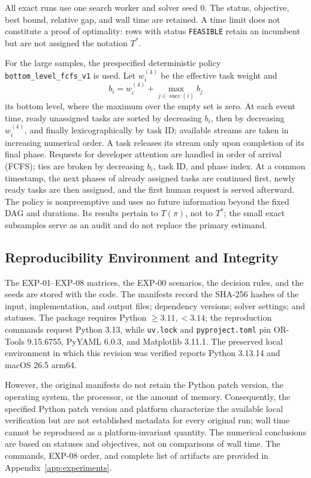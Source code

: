 All exact runs use one search worker and solver seed 0. The status, objective,
best bound, relative gap, and wall time are retained. A time limit does not
constitute a proof of optimality: rows with status \texttt{FEASIBLE} retain an
incumbent but are not assigned the notation $T^*$.

For the large samples, the prespecified deterministic policy
\texttt{bottom\_level\_fcfs\_v1} is used. Let $w_i^{(4)}$ be the effective task
weight and
\[
  b_i=w_i^{(4)}+\max_{j\in\operatorname{succ}(i)}b_j
\]
its bottom level, where the maximum over the empty set is zero. At each event
time, ready unassigned tasks are sorted by decreasing $b_i$, then by decreasing
$w_i^{(4)}$, and finally lexicographically by task ID; available streams are
taken in increasing numerical order. A task releases its stream only upon
completion of its final phase. Requests for developer attention are handled in
order of arrival (FCFS); ties are broken by decreasing $b_i$, task ID, and phase
index.
At a common timestamp, the next phases of already assigned tasks are continued
first, newly ready tasks are then assigned, and the first human request is
served afterward. The policy is nonpreemptive and uses no future information
beyond the fixed DAG and durations. Its results pertain to $T(\pi)$, not to
$T^*$; the small exact subsamples serve as an audit and do not replace the
primary estimand.

\subsection{Reproducibility Environment and Integrity}

The EXP-01--EXP-08 matrices, the EXP-00 scenarios, the decision rules, and the
seeds are stored with the code. The manifests record the SHA-256 hashes of the
input, implementation, and output files; dependency versions; solver settings;
and statuses. The package requires Python $\ge3.11,<3.14$; the reproduction
commands request Python 3.13, while \texttt{uv.lock} and
\texttt{pyproject.toml} pin OR-Tools 9.15.6755, PyYAML 6.0.3, and Matplotlib
3.11.1. The preserved local environment in which this revision was verified
reports Python 3.13.14 and macOS 26.5 arm64.

However, the original manifests do not retain the Python patch version, the
operating system, the processor, or the amount of memory. Consequently, the
specified Python patch version and platform characterize the available local
verification but are not established metadata for every original run; wall time
cannot be reproduced as a platform-invariant quantity. The numerical
conclusions are based on statuses and objectives, not on comparisons of wall
time. The commands, EXP-08 order, and complete list of artifacts are provided
in Appendix~\ref{app:experiments}.
